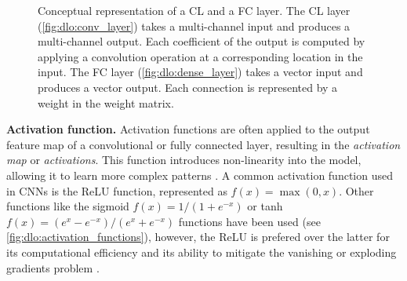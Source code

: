 \begin{figure}[htbp]
  \centering
    \caption{Conceptual representation of a \acl{CL} and a \acl{FC} layer. The
    \acl{CL} layer (\cref{fig:dlo:conv_layer}) takes a multi-channel input and
    produces a multi-channel output. Each coefficient of the output is computed
    by applying a convolution operation at a corresponding location in the
    input. The \acl{FC} layer (\cref{fig:dlo:dense_layer}) takes a vector input
    and produces a vector output. Each connection is represented by a weight in
    the weight matrix.}
  \label{fig:sota:layers}
\end{figure}

\noindent \textbf{Activation function.} Activation functions are often applied
to the output feature map of a convolutional or fully connected layer, resulting
in the \emph{activation map} or \emph{activations}. This function introduces
non-linearity into the model, allowing it to learn more complex patterns
\cite{long2015fully}. A common activation function used in \acp{CNN} is the
\ac{ReLU} function, represented as $f(x)=\max(0,x)$. Other functions like the
sigmoid $f(x)=1/(1+e^{-x})$ or tanh $f(x)=(e^{x} -e^{-x})/(e^{x}+e^{-x})$
functions have been used (see \cref{fig:dlo:activation_functions}), however, the
\ac{ReLU} is prefered over the latter for its computational efficiency and its
ability to mitigate the vanishing or exploding gradients problem
\cite{hochreiter2001gradient,glorot2010understanding}.\\

